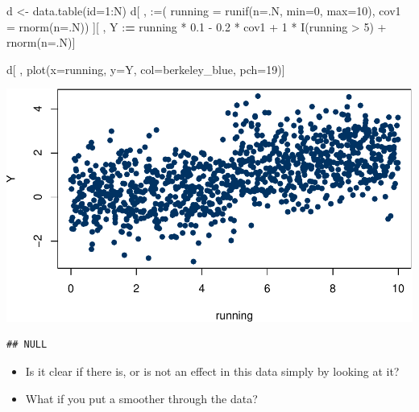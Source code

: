 \documentclass[
]{article}
\newenvironment{Shaded}{\begin{snugshade}}{\end{snugshade}}
\newcommand{\AttributeTok}[1]{\textcolor[rgb]{0.77,0.63,0.00}{#1}}
\newcommand{\DecValTok}[1]{\textcolor[rgb]{0.00,0.00,0.81}{#1}}
\newcommand{\ErrorTok}[1]{\textcolor[rgb]{0.64,0.00,0.00}{\textbf{#1}}}
\newcommand{\FloatTok}[1]{\textcolor[rgb]{0.00,0.00,0.81}{#1}}
\newcommand{\FunctionTok}[1]{\textcolor[rgb]{0.00,0.00,0.00}{#1}}
\newcommand{\NormalTok}[1]{#1}
\newcommand{\OtherTok}[1]{\textcolor[rgb]{0.56,0.35,0.01}{#1}}
\newcommand{\SpecialCharTok}[1]{\textcolor[rgb]{0.00,0.00,0.00}{#1}}
\newcommand{\StringTok}[1]{\textcolor[rgb]{0.31,0.60,0.02}{#1}}
\begin{document}
\begin{Shaded}
\begin{Highlighting}[]
\NormalTok{d }\OtherTok{\textless{}{-}} \FunctionTok{data.table}\NormalTok{(}\AttributeTok{id=}\DecValTok{1}\SpecialCharTok{:}\NormalTok{N)}
\NormalTok{d[ , }\StringTok{\textquotesingle{}:=\textquotesingle{}}\NormalTok{(}
  \AttributeTok{running =} \FunctionTok{runif}\NormalTok{(}\AttributeTok{n=}\NormalTok{.N, }\AttributeTok{min=}\DecValTok{0}\NormalTok{, }\AttributeTok{max=}\DecValTok{10}\NormalTok{), }
  \AttributeTok{cov1    =} \FunctionTok{rnorm}\NormalTok{(}\AttributeTok{n=}\NormalTok{.N)) ][ ,}
\NormalTok{  Y }\SpecialCharTok{:}\ErrorTok{=}\NormalTok{ running }\SpecialCharTok{*} \FloatTok{0.1} \SpecialCharTok{{-}} \FloatTok{0.2} \SpecialCharTok{*}\NormalTok{ cov1 }\SpecialCharTok{+} \DecValTok{1} \SpecialCharTok{*} \FunctionTok{I}\NormalTok{(running }\SpecialCharTok{\textgreater{}} \DecValTok{5}\NormalTok{) }\SpecialCharTok{+} \FunctionTok{rnorm}\NormalTok{(}\AttributeTok{n=}\NormalTok{.N)]}

\NormalTok{d[ , }\FunctionTok{plot}\NormalTok{(}\AttributeTok{x=}\NormalTok{running, }\AttributeTok{y=}\NormalTok{Y, }\AttributeTok{col=}\NormalTok{berkeley\_blue, }\AttributeTok{pch=}\DecValTok{19}\NormalTok{)]}
\end{Highlighting}
\end{Shaded}

\includegraphics{241-live-session_files/figure-latex/slightly more realistic data-1.pdf}

\begin{verbatim}
## NULL
\end{verbatim}

\begin{itemize}
\item
  Is it clear if there is, or is not an effect in this data simply by looking at it?
\item
  What if you put a smoother through the data?
\end{itemize}
\end{document}
